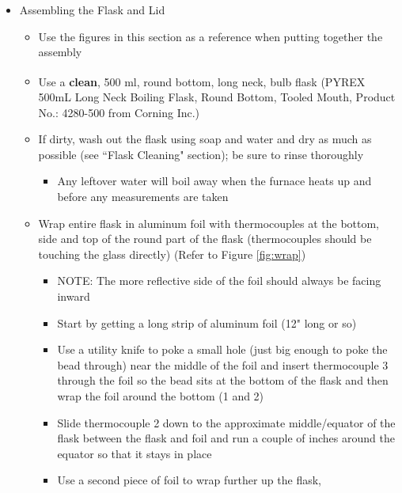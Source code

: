 \documentclass[letterpaper,11pt]{article}
\begin{document}
\begin{itemize}
\newpage      
    \item Assembling the Flask and Lid 
        \begin{itemize}
        \item Use the figures in this section as a reference when putting 
            together the assembly
        
        \item Use a \textbf{clean}, 500 ml, round bottom, long neck, bulb flask 
            (PYREX\textsuperscript{\textcopyright} 500mL Long Neck Boiling 
            Flask, Round Bottom, Tooled Mouth, Product No.: 4280-500 from 
            Corning Inc.)
        \item If dirty, wash out the flask using soap and water and dry as much 
            as possible (see ``Flask Cleaning" section); be sure to rinse
            thoroughly
                \begin{itemize}
                \item Any leftover water will boil away when the furnace heats 
                up and before any measurements are taken
                \end{itemize}        
        \item Wrap entire flask in aluminum foil with thermocouples at the 
            bottom, side and top of the round part of the flask (thermocouples 
            should be touching the glass directly) (Refer to Figure 
            \ref{fig:wrap})
                \begin{itemize}
                \item NOTE: The more reflective side of the foil should always 
                    be facing inward
                \item Start by getting a long strip of aluminum foil (12" long 
                    or so)
                \item Use a utility knife to poke a small hole (just big enough 
                    to poke the bead through) near the middle of 
                    the foil and insert thermocouple 3 through the foil so the 
                    bead sits at the bottom of the flask and then wrap the foil 
                    around the bottom (1 and 2)
                \item Slide thermocouple 2 down to the approximate 
                    middle/equator of the flask between the flask and foil and run
                    a couple of inches around the equator so that it stays in place  
                \item Use a second piece of foil to wrap further up the flask, 

\end{itemize}
\end{itemize}
\end{itemize}
\end{document}
